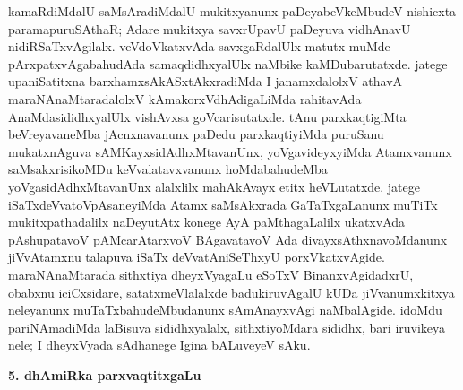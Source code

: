 kamaRdiMdalU saMsAradiMdalU mukitxyanunx paDeyabeVkeMbudeV nishicxta paramapuruSAthaR; Adare mukitxya savxrUpavU paDeyuva vidhAnavU nidiRSaTxvAgilalx. veVdoVkatxvAda savxgaRdalUlx matutx muMde pArxpatxvAgabahudAda samaqdidhxyalUlx naMbike kaMDubarutatxde. jatege upaniSatitxna barxhamxsAkASxtAkxradiMda I janamxdalolxV athavA maraNAnaMtaradalolxV kAmakorxVdhAdigaLiMda rahitavAda AnaMdasididhxyalUlx vishAvxsa goVcarisutatxde. tAnu parxkaqtigiMta beVreyavaneMba jAcnxnavanunx paDedu parxkaqtiyiMda puruSanu mukatxnAguva sAMKayxsidAdhxMtavanUnx, yoVgavideyxyiMda Atamxvanunx saMsakxrisikoMDu keVvalatavxvanunx hoMdabahudeMba yoVgasidAdhxMtavanUnx alalxlilx mahAkAvayx etitx heVLutatxde. jatege iSaTxdeVvatoVpAsaneyiMda Atamx saMsAkxrada GaTaTxgaLanunx muTiTx mukitxpathadalilx naDeyutAtx konege AyA paMthagaLalilx ukatxvAda pAshupatavoV pAMcarAtarxvoV BAgavatavoV Ada divayxsAthxnavoMdanunx jiVvAtamxnu talapuva iSaTx deVvatAniSeThxyU porxVkatxvAgide. maraNAnaMtarada sithxtiya dheyxVyagaLu eSoTxV BinanxvAgidadxrU, obabxnu iciCxsidare, satatxmeVlalalxde badukiruvAgalU kUDa jiVvanumxkitxya neleyanunx muTaTxbahudeMbudanunx sAmAnayxvAgi naMbalAgide. idoMdu pariNAmadiMda laBisuva sididhxyalalx, sithxtiyoMdara sididhx, bari iruvikeya nele; I dheyxVyada sAdhanege Igina bALuveyeV sAku.

\smallskip
\begin{center}
{\Large\bf 5. dhAmiRka parxvaqtitxgaLu}
\end{center}

